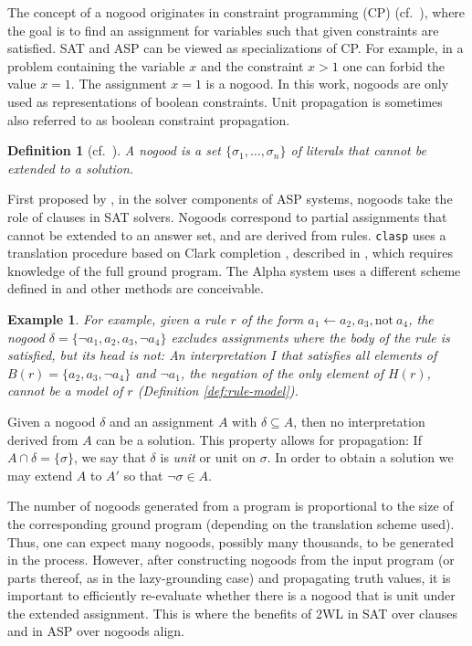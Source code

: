 \documentclass{vutinfth} %
\newtheorem{example}{Example}[chapter]
\newtheorem{definition}{Definition}[chapter]
\newcommand{\ass}{A}
\newcommand{\headf}{H}
\newcommand{\bodyf}{B}
\newcommand{\fail}{\mathrm{not } \ \xspace}
\newcommand{\from}{\ensuremath{\leftarrow}}
\newcommand{\bsgl}{\sigma}
\newcommand{\clasp}{\texttt{clasp}\xspace}
\begin{document}
The concept of a nogood originates in constraint programming (CP) (cf.~\cite{clasp,handbook-cp,handbook-kr-cp}), where the goal is to find an assignment for variables such that given constraints are satisfied. SAT and ASP can be viewed as specializations of CP. For example, in a problem containing the variable $x$ and the constraint $x > 1$ one can forbid the value $x = 1$. The assignment $x = 1$ is a nogood. In this work, nogoods are only used as representations of boolean constraints. Unit propagation is sometimes also referred to as boolean constraint propagation.

\begin{definition}[cf.~\cite{handbook-cp}]
\label{def:nogood}
A \emph{nogood} is a set $\{ \bsgl_1, \ldots, \bsgl_n \}$ of literals that cannot be extended to a solution.
\end{definition}

First proposed by \citet{clasp-first}, in the solver components of ASP systems, nogoods take the role of clauses in SAT solvers. Nogoods correspond to partial assignments that cannot be extended to an answer set, and are derived from rules. \clasp uses a translation procedure based on Clark completion \cite{clark}, described in \cite[Section 3]{clasp}, which requires knowledge of the full ground program. The Alpha system uses a different scheme defined in \cite[Definition 5]{blend} and other methods are conceivable.

\begin{example}
\label{ex:rule-to-nogood}
For example, given a rule $r$ of the form $a_1 \from a_2, a_3, \fail a_4$, the nogood $\delta = \{\neg a_1, a_2, a_3, \neg a_4 \}$ excludes assignments where the body of the rule is satisfied, but its head is not: An interpretation $I$ that satisfies all elements of $\bodyf(r) = \{a_2, a_3, \neg a_4 \}$ and $\neg a_1$, the negation of the only element of $\headf(r)$, cannot be a model of $r$ (Definition \ref{def:rule-model}).
\end{example}

Given a nogood $\delta$ and an assignment $\ass$ with $\delta \subseteq \ass$, then no interpretation derived from $\ass$ can be a solution. This property allows for propagation: If $\ass \cap \delta = \{ \bsgl \}$, we say that $\delta$ is \emph{unit} or unit on $\bsgl$. In order to obtain a solution we may extend $\ass$ to $\ass'$ so that $\neg \bsgl \in \ass$.

The number of nogoods generated from a program is proportional to the size of the corresponding ground program (depending on the translation scheme used). Thus, one can expect many nogoods, possibly many thousands, to be generated in the process. However, after constructing nogoods from the input program (or parts thereof, as in the lazy-grounding case) and propagating truth values, it is important to efficiently re-evaluate whether there is a nogood that is unit under the extended assignment. This is where the benefits of 2WL in SAT over clauses and in ASP over nogoods align.
\end{document}
